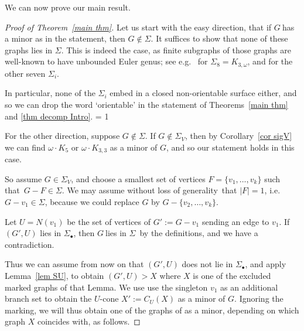 \documentclass{article}
\newcommand{\Debug}{0}
\newcommand{\SU}{\ensuremath{\Sig_\bullet}}
\newcommand{\Sig}{\ensuremath{\Sigma}}
\newcommand{\g}{\ensuremath{G\ }}
\newcommand{\G}{\ensuremath{G}}
\newcommand{\Ktt}{\ensuremath{K_{3,3}}}
\newcommand{\Lr}[1]{Lemma~\ref{#1}}
\newcommand{\Tr}[1]{Theorem~\ref{#1}}
\newcommand{\Trs}[1]{Theorems~\ref{#1}}
\newcommand{\Cr}[1]{Corollary~\ref{#1}}
\newcommand{\st}{such that}
\newcommand{\obda}{without loss of generality}
\newcommand{\mymargin}[1]{\ifnum \Debug = 1
  \marginpar{\begin{minipage}{\marginparwidth}\small \begin{flushleft}{\color{blue}#1}\end{flushleft}\end{minipage}}\fi
}
\begin{document}
We can now prove our main result.
\begin{proof}[Proof of \Tr{main thm}]
Let us start with the easy direction, that if \g has a minor as in the statement, then  $G \not\in \Sig$. It suffices to show that none of these graphs lies in $\Sig$. This is indeed the case, as finite subgraphs of those graphs are well-known to have unbounded Euler genus; see e.g.\ \cite{RiSiCro} for $\Sig_8=K_{3,\omega}$, and \cite{MilAdd} for the other seven $\Sig_i$. 

In particular, none of the $\Sig_i$ embed in a closed non-orientable surface either, and so we can drop the word `orientable' in the statement of \Trs{main thm} and \ref{thm decomp Intro}. \mymargin{Mention projective grids?}



\medskip
For the other direction, suppose $G \not\in \Sig$. If $G \not\in \Sig_V$, then by  \Cr{cor sigV} we can find $\omega \cdot K_5$ or $\omega \cdot \Ktt$ as a minor of \G, and so our statement holds in this case. 

So assume  $G \in \Sig_V$, and choose a smallest set of vertices $F=\{v_1,\ldots,v_k\}$ \st\ $G-F \in \Sig$. We may assume \obda\ that $|F|=1$, i.e.\ $G -v_1\in \Sig$, because we could  replace $G$ by $G- \{v_2,\ldots,v_k\}$.



Let $U= N(v_1)$ be the set of vertices of $G':= G-v_1$ sending an edge to $v_1$. If $(G',U)$ lies in \SU, then \g lies in \Sig\ by the definitions, and we have a contradiction. 

Thus we can assume from now on  that $(G',U)$ does not lie in \SU, and apply \Lr{lem SU}, to obtain $(G',U)> X$ where $X$ is one of the excluded marked graphs of that Lemma. We use use the singleton $v_1$ as an additional branch set to obtain the $U$-cone $X':= C_U(X)$ as a minor of \G. Ignoring the marking, we will thus obtain one of the graphs of  as a minor, depending on which graph $X$ coincides with, as follows. 



\end{proof}
\end{document}
